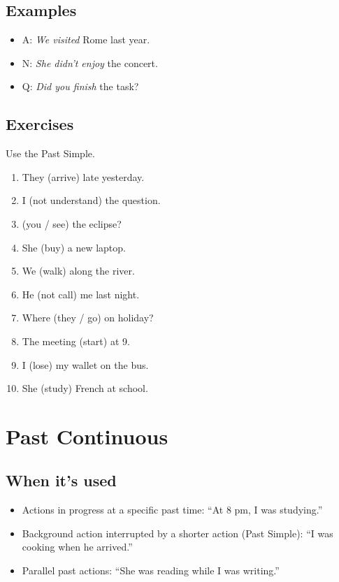 \documentclass[11pt,a4paper]{article}
\begin{document}
\subsection*{Examples}
\begin{itemize}
  \item A: \emph{We visited} Rome last year.
  \item N: \emph{She didn’t enjoy} the concert.
  \item Q: \emph{Did you finish} the task?
\end{itemize}

\subsection*{Exercises}
Use the Past Simple.
\begin{enumerate}
  \item They \underline{\hspace{2.5cm}} (arrive) late yesterday.
  \item I \underline{\hspace{2.5cm}} (not understand) the question.
  \item \underline{\hspace{2.5cm}} (you / see) the eclipse?
  \item She \underline{\hspace{2.5cm}} (buy) a new laptop.
  \item We \underline{\hspace{2.5cm}} (walk) along the river.
  \item He \underline{\hspace{2.5cm}} (not call) me last night.
  \item Where \underline{\hspace{2.5cm}} (they / go) on holiday?
  \item The meeting \underline{\hspace{2.5cm}} (start) at 9.
  \item I \underline{\hspace{2.5cm}} (lose) my wallet on the bus.
  \item She \underline{\hspace{2.5cm}} (study) French at school.
\end{enumerate}

\section{Past Continuous}
\subsection*{When it’s used}
\begin{itemize}
  \item Actions in progress at a specific past time: ``At 8 pm, I was studying.''
  \item Background action interrupted by a shorter action (Past Simple): ``I was cooking when he arrived.''
  \item Parallel past actions: ``She was reading while I was writing.''
\end{itemize}
\end{document}
